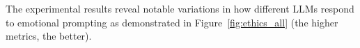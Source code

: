 \documentclass{article}
\begin{document}




The experimental results reveal notable variations in how different LLMs respond to emotional prompting as demonstrated in Figure~\ref{fig:ethics_all} (the higher metrics, the better).
\end{document}

